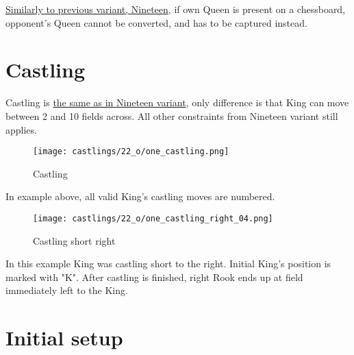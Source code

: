 \hyperref[fig:scn_n_22_only_one_queen]{Similarly to previous variant, Nineteen},
if own Queen is present on a chessboard, opponent's Queen cannot be
converted, and has to be captured instead.


\vspace*{-0.3\baselineskip}
\section*{Castling}
\label{sec:One/Castling}

\vspace*{-0.3\baselineskip}
Castling is
\hyperref[sec:Nineteen/Castling]{the same as in Nineteen variant},
only difference is that King can move
between 2 and 10 fields across. All other constraints from Nineteen variant still
applies.

\vspace*{-0.7\baselineskip}
\noindent
\begin{figure}[!h]
\texttt{[image: castlings/22\_o/one\_castling.png]}
\vspace*{-1.4\baselineskip}
\caption{Castling}
\label{fig:one_castling}
\end{figure}

\vspace*{-0.3\baselineskip}
In example above, all valid King's castling moves are numbered.

\vspace*{-0.7\baselineskip}
\noindent
\begin{figure}[!h]
\texttt{[image: castlings/22\_o/one\_castling\_right\_04.png]}
\vspace*{-1.4\baselineskip}
\caption{Castling short right}
\label{fig:one_castling_right_04}
\end{figure}

\vspace*{-0.3\baselineskip}
In this example King was castling short to the right. Initial King's position is
marked with "K". After castling is finished, right Rook ends up at field immediately
left to the King.

\clearpage %

\section*{Initial setup}
\label{sec:One/Initial setup}


